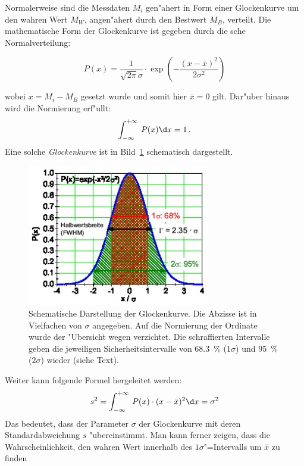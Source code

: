 Normalerweise sind die Messdaten $M_i$ gen"ahert in Form einer
Glockenkurve um den wahren Wert $M_W$, angen"ahert durch den
Bestwert $M_B$, verteilt. Die mathematische Form der
Glockenkurve ist gegeben durch die
sche
Normalverteilung:
%
\begin{important}
\begin{equation} \label{g}
  P(x) =
  \frac{1}{\sqrt{2\pi} \sigma} \cdot
  \exp\left( -\frac{(x-\bar{x})^{2}}{2\sigma^{2}} \right)
\end{equation}
\end{important}
%
wobei $x = M_i - M_B$ gesetzt wurde und somit hier $\bar{x}=0$
gilt. Dar"uber hinaus wird die Normierung erf"ullt:
%
\begin{equation} \label{h}
  \int_{-\infty}^{+\infty}\,P(x) \d x = 1 \, .
\end{equation}
%
Eine solche \emph{Glockenkurve} ist in Bild~\ref{a:glockenkurve}
schematisch dargestellt.
%
\begin{figure}[htb]
  \centering
  \includegraphics[width=8cm]{00_einl/gaussfkt}
 \caption[Gau"ssche Glockenkurve]{\label{a:glockenkurve}Schematische Darstellung
   der Glockenkurve. Die Abzisse ist in Vielfachen von $\sigma$ angegeben.
   Auf die Normierung
   der Ordinate wurde der "Ubersicht wegen verzichtet. Die schraffierten
   Intervalle geben die jeweiligen Sicherheitsintervalle von 68.3~\%
   ($1\sigma$) und 95~\% ($2\sigma$) wieder (siehe Text).}
\end{figure}
%
Weiter kann folgende Formel hergeleitet werden:
%
\begin{equation} \label{i}
 s^2 = \int_{-\infty}^{+\infty}\,P(x) \cdot (x-\bar{x})^{2} \d x = \sigma^{2}
\end{equation}
%
Das bedeutet, dass der Parameter $\sigma$ der Glockenkurve mit deren 
Standardabweichung $s$ "ubereinstimmt. Man kann
ferner zeigen, dass die Wahrscheinlichkeit, den wahren Wert
innerhalb des $1\sigma$"=Intervalls um $\bar{x}$ zu finden

